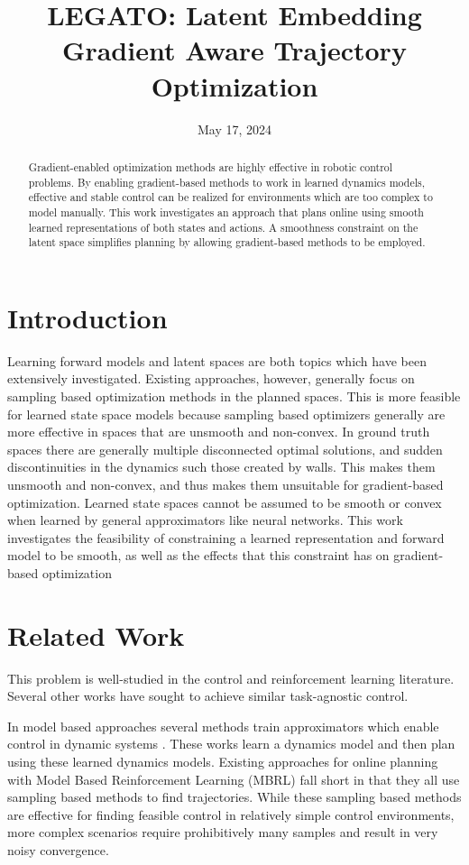 \documentclass[12pt, twocolumn]{article}
\begin{document}
\title{LEGATO: Latent Embedding Gradient Aware Trajectory Optimization}
\date{May 17, 2024}
\maketitle
\begin{abstract}
    Gradient-enabled optimization methods are highly effective in robotic control problems.
    By enabling gradient-based methods to work in learned dynamics models, effective and stable control can be realized for environments which are too complex to model manually.
    This work investigates an approach that plans online using smooth learned representations of both states and actions.
    A smoothness constraint on the latent space simplifies planning by allowing gradient-based methods to be employed.
\end{abstract}
\section{Introduction}
Learning forward models and latent spaces are both topics which have been extensively investigated.
Existing approaches, however, generally focus on sampling based optimization methods in the planned spaces.
This is more feasible for learned state space models because sampling based optimizers generally are more effective in spaces that are unsmooth and non-convex.
In ground truth spaces there are generally multiple disconnected optimal solutions, and sudden discontinuities in the dynamics such those created by walls.
This makes them unsmooth and non-convex, and thus makes them unsuitable for gradient-based optimization.
Learned state spaces cannot be assumed to be smooth or convex when learned by general approximators like neural networks.
This work investigates the feasibility of constraining a learned representation and forward model to be smooth, as well as the effects that this constraint has on gradient-based optimization

\section{Related Work}

This problem is well-studied in the control and reinforcement learning literature.
Several other works have sought to achieve similar task-agnostic control.

In model based approaches several methods train approximators which enable control in dynamic systems \cite{williams_information_2017,chua_deep_2018,lambert_low_2019}.
These works learn a dynamics model and then plan using these learned dynamics models.
Existing approaches for online planning with Model Based Reinforcement Learning (MBRL) fall short in that they all use sampling based methods to find trajectories.
While these sampling based methods are effective for finding feasible control in relatively simple control environments, more complex scenarios require prohibitively many samples and result in very noisy convergence.
\end{document}
